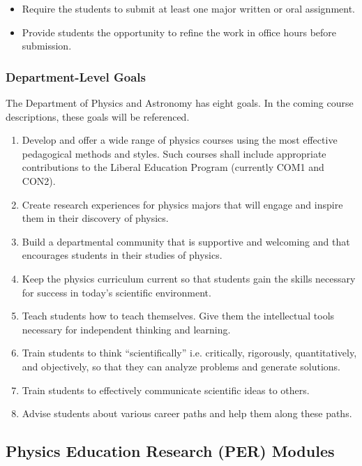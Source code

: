 \documentclass[../../../main.tex]{subfiles}
\begin{document}
\begin{enumerate}
\begin{itemize}
\item Require the students to submit at least one major written or oral assignment.
\item Provide students the opportunity to refine the work in office hours before submission.
\end{itemize}

\subsubsection{Department-Level Goals}

The Department of Physics and Astronomy has eight goals. In the coming course descriptions, these goals will be referenced.

\begin{enumerate}
\item Develop and offer a wide range of physics courses using the most effective pedagogical methods and styles.  Such courses shall include appropriate contributions to the Liberal Education Program (currently COM1 and CON2).
\item Create research experiences for physics majors that will engage and inspire them in their discovery of physics.
\item Build a departmental community that is supportive and welcoming and that encourages students in their studies of physics.
\item Keep the physics curriculum current so that students gain the skills necessary for success in today's scientific environment.
\item Teach students how to teach themselves. Give them the intellectual tools necessary for independent thinking and learning.
\item Train students to think ``scientifically'' i.e. critically, rigorously, quantitatively, and objectively, so that they can analyze problems and generate solutions.
\item Train students to effectively communicate scientific ideas to others.
\item Advise students about various career paths and help them along these paths.
\end{enumerate}

\end{enumerate}

\subsection{Physics Education Research (PER) Modules}
\label{sec:per}
\end{document}
